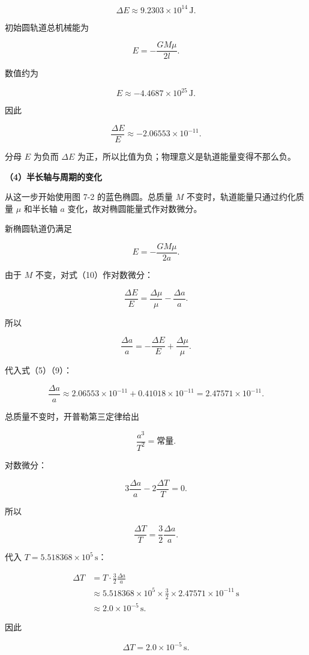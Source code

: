 \documentclass[12pt,a4paper,UTF8]{ctexart}
\begin{document}
\[
\boxed{\Delta E\approx9.2303\times10^{14}\,\mathrm J}.
\tag{7}
\]

初始圆轨道总机械能为

\[
E=-\frac{GM\mu}{2l}.
\tag{8}
\]

数值约为

\[
E\approx-4.4687\times10^{25}\,\mathrm J.
\]

因此

\[
\boxed{\frac{\Delta E}{E}\approx-2.06553\times10^{-11}}.
\tag{9}
\]

分母 \(E\) 为负而 \(\Delta E\)
为正，所以比值为负；物理意义是轨道能量变得不那么负。

\textbf{（4）半长轴与周期的变化}

从这一步开始使用图 7-2 的蓝色椭圆。总质量 \(M\)
不变时，轨道能量只通过约化质量 \(\mu\) 和半长轴 \(a\)
变化，故对椭圆能量式作对数微分。

新椭圆轨道仍满足

\[
E=-\frac{GM\mu}{2a}.
\tag{10}
\]

由于 \(M\) 不变，对式（10）作对数微分：

\[
\frac{\Delta E}{E}
=\frac{\Delta\mu}{\mu}-\frac{\Delta a}{a}.
\]

所以

\[
\boxed{
\frac{\Delta a}{a}
=-\frac{\Delta E}{E}+\frac{\Delta\mu}{\mu}
}.
\tag{11}
\]

代入式（5）（9）：

\[
\frac{\Delta a}{a}
\approx2.06553\times10^{-11}+0.41018\times10^{-11}
=2.47571\times10^{-11}.
\tag{12}
\]

总质量不变时，开普勒第三定律给出

\[
\frac{a^3}{T^2}=\text{常量}.
\]

对数微分：

\[
3\frac{\Delta a}{a}-2\frac{\Delta T}{T}=0.
\]

所以

\[
\frac{\Delta T}{T}=\frac32\frac{\Delta a}{a}.
\tag{13}
\]

代入 \(T=5.518368\times10^5\,\mathrm s\)：

\[
\begin{aligned}
\Delta T
&=T\cdot\frac32\frac{\Delta a}{a}\\
&\approx5.518368\times10^5\times\frac32\times2.47571\times10^{-11}\,\mathrm s\\
&\approx2.0\times10^{-5}\,\mathrm s.
\end{aligned}
\]

因此

\[
\boxed{\Delta T=2.0\times10^{-5}\,\mathrm s}.
\tag{14}
\]
\end{document}
